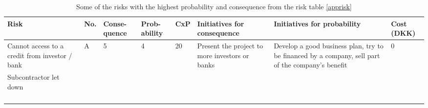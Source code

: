 \def\arraystretch{1.7}
\begin{table}[h!]
\label{riskshort}
\centering
\scriptsize
\begin{tabular}{|p{3cm} |p{0.3cm} |p{0.9cm} |p{0.9cm} |p{0.5cm} |p{3cm} |p{3cm} |p{0.7cm}|}
\hline
Risk 	&	No.	& Conse- \newline quence	& Prob-\newline  ability	& CxP	& Initiatives \newline for consequence	& Initiatives \newline for probability	& Cost \newline (DKK) \\
\hline
Cannot access to a credit from investor / bank					& A	& 5				&	4			& 20	& Present the project to more investors or banks	& Develop a good business plan, try to be financed by a company, sell part of the company's benefit	& 0\\
\hline
Subcontractor let down & & & & & &\\
\hline
& & & & & &\\
\hline
& & & & & &\\
\hline
& & & & & &\\
\hline
& & & & & &\\
\hline
\end{tabular}
\caption{Some of the risks with the highest probability and consequence from the risk table \ref{apprisk}}
\end{table}
\def\arraystretch{1}
